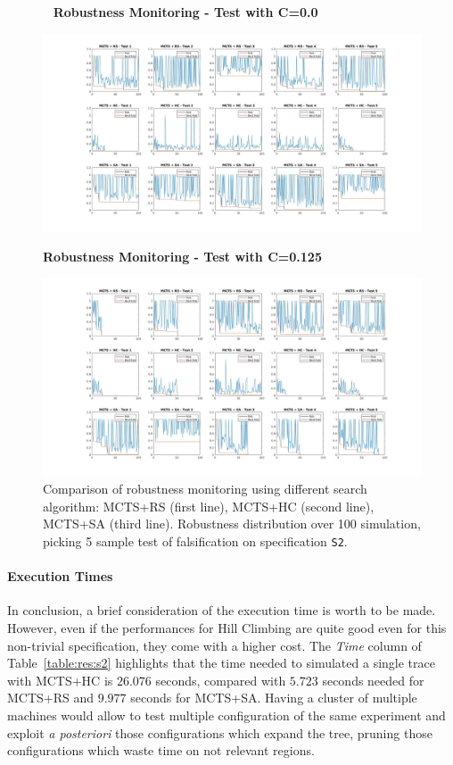 \documentclass[11pt]{article}
\begin{document}
\begin{figure}[H]~\label{img:rob_monitoring}
    \centering
    \textbf{Robustness Monitoring - Test with C=0.0}\par
    \includegraphics[width=\linewidth]{img/0_000/compare_search_rob_blue.jpg}

    \textbf{Robustness Monitoring - Test with C=0.125}\par
    \includegraphics[width=\linewidth]{img/0_125/compare_search_rob_blue_orange.jpg}
    \caption{Comparison of robustness monitoring using different search algorithm: MCTS+RS (first line), MCTS+HC (second line), MCTS+SA (third line). Robustness distribution over 100 simulation, picking 5 sample test of falsification on specification \texttt{S2}.}
\end{figure}

\paragraph{Execution Times}
In conclusion, a brief consideration of the execution time is worth to be made.
However, even if the performances for Hill Climbing are quite good even for this non-trivial specification, they come with a higher cost. The \textit{Time} column of Table~\ref{table:res:s2} highlights that the time needed to simulated a single trace with MCTS+HC is $26.076$ seconds, compared with $5.723$ seconds needed for MCTS+RS and $9.977$ seconds for MCTS+SA.
Having a cluster of multiple machines would allow to test multiple configuration of the same experiment and exploit \textit{a posteriori} those configurations which expand the tree, pruning those configurations which waste time on not relevant regions. 
\end{document}
